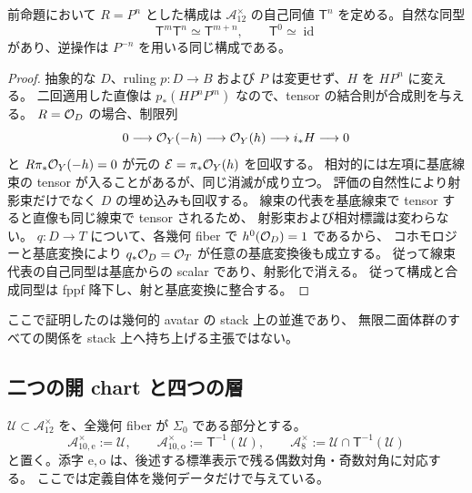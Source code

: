 \begin{theorem}[族上の幾何的並進]
\label{thm:qa-translation}
前命題において $R=P^n$ とした構成は $\mathcal A_{12}^{\times}$ の自己同値
$\mathsf T^n$ を定める。自然な同型
\[
 \mathsf T^m\mathsf T^n\simeq\mathsf T^{m+n},\qquad
 \mathsf T^0\simeq\operatorname{id}
\]
があり、逆操作は $P^{-n}$ を用いる同じ構成である。
\end{theorem}

\begin{proof}
抽象的な $D$、ruling $p:D\to B$ および $P$ は変更せず、$H$ を $HP^n$ に変える。
二回適用した直像は $p_*(HP^nP^m)$ なので、tensor の結合則が合成則を与える。
$R=\mathcal O_D$ の場合、制限列
\[
 0\longrightarrow\mathcal O_Y(-h)\longrightarrow\mathcal O_Y(h)\longrightarrow i_*H\longrightarrow0
\]
と $R\pi_*\mathcal O_Y(-h)=0$ が元の $\mathcal E=\pi_*\mathcal O_Y(h)$ を回収する。
相対的には左項に基底線束の tensor が入ることがあるが、同じ消滅が成り立つ。
評価の自然性により射影束だけでなく $D$ の埋め込みも回収する。
線束の代表を基底線束で tensor すると直像も同じ線束で tensor されるため、
射影束および相対標識は変わらない。
$q:D\to T$ について、各幾何 fiber で $h^0(\mathcal O_D)=1$ であるから、
コホモロジーと基底変換により $q_*\mathcal O_D=\mathcal O_T$ が任意の基底変換後も成立する。
従って線束代表の自己同型は基底からの scalar であり、射影化で消える。
従って構成と合成同型は fppf 降下し、射と基底変換に整合する。
\end{proof}

ここで証明したのは幾何的 avatar の stack 上の並進であり、
無限二面体群のすべての関係を stack 上へ持ち上げる主張ではない。

\subsection{二つの開 chart と四つの層}

\begin{definition}
\label{def:qa-open-charts}
$\mathcal U\subset\mathcal A_{12}^{\times}$ を、全幾何 fiber が $\Sigma _0$ である部分とする。
\[
 \mathcal A_{10,\mathrm e}^{\times}:=\mathcal U,
 \qquad
 \mathcal A_{10,\mathrm o}^{\times}:=\mathsf T^{-1}(\mathcal U),
 \qquad
 \mathcal A_8^{\times}:=\mathcal U\cap\mathsf T^{-1}(\mathcal U)
\]
と置く。添字 $\mathrm e,\mathrm o$ は、後述する標準表示で残る偶数対角・奇数対角に対応する。
ここでは定義自体を幾何データだけで与えている。
\end{definition}

